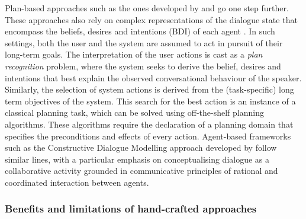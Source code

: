 Plan-based approaches such as the ones developed by \cite{Freedman:2000} and \cite{Allen:2000:AGD:973935.973937} go one step further. These approaches also rely on complex representations of the dialogue state that encompass the beliefs, desires and intentions (BDI) of each agent \citep{Cohen1979,Allen1980}.  In such settings, both the user and the system are assumed to act in pursuit of their long-term goals.  The interpretation of the user actions is cast as a \textit{plan recognition} problem, where the system seeks to derive the belief, desires and intentions that best explain the observed conversational behaviour of the speaker.  Similarly, the selection of system actions is derived from the (task-specific) long term objectives of the system. This search for the best action is an instance of a classical planning task, which can be solved using off-the-shelf planning algorithms. These algorithms require the declaration of a planning domain that specifies the preconditions and effects of every action. Agent-based frameworks such as the Constructive Dialogue Modelling approach developed by \cite{Jokinen:2009} follow similar lines, with a particular emphasis on conceptualising dialogue as a collaborative activity grounded in communicative principles of rational and coordinated interaction between agents. 

\subsubsection*{Benefits and limitations of hand-crafted approaches}

